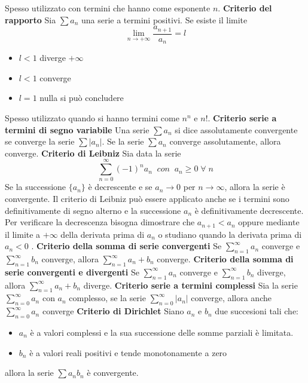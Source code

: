 \documentclass[a4paper, 9pt]{report}
\begin{document}
Spesso utilizzato con termini che hanno come esponente $n$.
\textbf{Criterio del rapporto} Sia $\sum a_n$ una serie a termini positivi. Se esiste il limite 
\[
    \lim_{n\rightarrow +\infty} \frac{a_{n+1}}{a_n} = l
\]
\begin{itemize}
    \item $l<1$ diverge $+\infty$
    \item $l<1$ converge 
    \item $l=1$ nulla si può concludere
\end{itemize}
Spesso utilizzato quando si hanno termini come $n^n$ e $n!$.
\textbf{Criterio serie a termini di segno variabile} Una serie $\sum a_n$ si dice assolutamente convergente se converge la serie $\sum |a_n|$. Se la serie $\sum a_n$ converge assolutamente, allora converge.\newline
\newline
\textbf{Criterio di Leibniz} Sia data la serie 
\[
    \sum_{n=0}^{\infty}(-1)^n a_n \;\; con  \;\; a_n\geq 0 \;\forall\;n
\]
Se la successione $\{a_n\}$ è decrescente e se $a_n \rightarrow 0$ per $n \rightarrow \infty$, allora la serie è convergente.\newline
Il criterio di Leibniz può essere applicato anche se i termini sono definitivamente di segno alterno e la successione $a_n$ è definitivamente decrescente.\newline
Per verificare la decrescenza bisogna dimostrare che $a_{n+1}<a_n$ oppure mediante il limite a $+ \infty$ della derivata prima di $a_n$ o studiano quando la derivata prima di $a_n<0$ .\newline
\newline
\textbf{Criterio della somma di serie convergenti} Se $\sum_{n=1}^{\infty} a_n$ converge e $\sum_{n=1}^{\infty} b_n$ converge, allora $\sum_{n=1}^{\infty} a_n +b_n$ converge.\newline
\newline
\textbf{Criterio della somma di serie convergenti e divergenti} Se $\sum_{n=1}^{\infty} a_n$ converge e $\sum_{n=1}^{\infty} b_n$ diverge, allora $\sum_{n=1}^{\infty} a_n + b_n$ diverge.\newline
\newline
\textbf{Criterio serie a termini complessi} Sia la serie $\sum_{n=0}^{\infty} a_n$ con $a_n$ complesso, se la serie  $\sum_{n=0}^{\infty} |a_n|$ converge, allora anche $\sum_{n=0}^{\infty} a_n$ converge \newline
\newline
\textbf{Criterio di Dirichlet} Siano $a_n$ e $b_n$ due succesioni tali che:
\begin{itemize}
    \item $a_n$ è a valori complessi e la sua successione delle somme parziali è limitata.
    \item $b_n$ è a valori reali positivi e tende monotonamente a zero
\end{itemize}
allora la serie $\sum a_nb_n$ è convergente.
\end{document}
